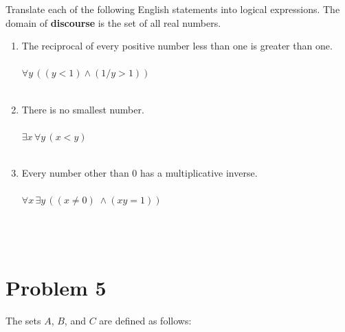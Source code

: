 \documentclass{amsart}
\theoremstyle{definition}
\theoremstyle{Exercise}
\theoremstyle{remark}
\theoremstyle{rule}
\numberwithin{equation}{section}
\begin{document}
Translate each of the following English statements into logical expressions. The domain of {\bf discourse} is the set of all real numbers.\\
\begin{enumerate}[label=(\alph*)]

\item The reciprocal of every positive number less than one is greater than one.\\\\
$\forall y\, ((y<1) \land (1/y>1))$
\\\\
\item There is no smallest number.\\\\
$\exists x \, \forall y \, (x<y)$
\\\\

\item Every number other than 0 has a multiplicative inverse.\\\\
$\forall x \, \exists y \, \left((x\not= 0)\; \land (xy = 1)\right)$\\\\
\\\\
\end{enumerate}



 \newpage


\section*{Problem 5}
The sets $A$, $B$, and $C$ are defined as follows:\\
\end{document}
